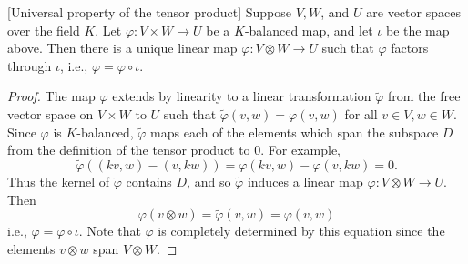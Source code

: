 \begin{thm}\label{universal-prop-tensor}[Universal property of the tensor product]  Suppose $V,W$, and $U$ are vector spaces over the field $K$.  Let $\varphi \colon V \times W \to U$ be a $K$-balanced map, and let $\iota$ be the map above.  Then there is a unique linear map $\varphi \colon V \otimes W \to U$ such that $\varphi$ factors through $\iota$, i.e., $\varphi = \varphi \circ \iota$.
\end{thm}
\begin{proof}
The map $\varphi$ extends by linearity to a linear transformation $\widetilde{\varphi}$ from the free vector space on $V \times W$ to $U$ such that $\widetilde{\varphi}(v , w) = \varphi (v,w)$ for all $v \in V, w \in W$.  Since $\varphi$ is $K$-balanced, $\widetilde{\varphi}$ maps each of the elements which span the subspace $D$ from the definition of the tensor product to 0.  For example,
\[ \widetilde{\varphi} ((kv, w) - (v, kw)) = \varphi(kv, w ) - \varphi (v, kw) = 0. \]
Thus the kernel of $\widetilde{\varphi}$ contains $D$, and so $\widetilde{\varphi}$ induces a linear map $\varphi \colon V \otimes W \to U$.  Then
\[ \varphi( v \otimes w) = \widetilde{\varphi}( v , w) = \varphi ( v , w) \]
i.e., $\varphi = \varphi \circ \iota$. Note that $\varphi$ is completely determined by this equation since the elements $v \otimes w$ span $V \otimes W$.
\end{proof}



